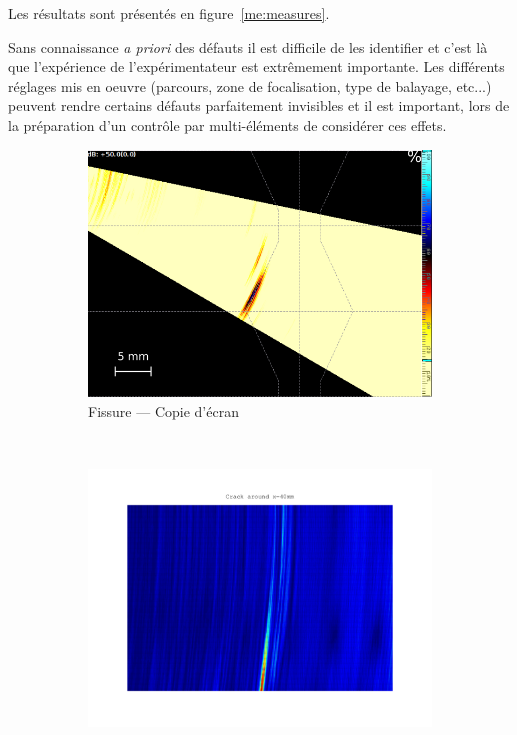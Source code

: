 Les résultats sont présentés en figure~\ref{me:measures}.

Sans connaissance \textit{a priori} des défauts il est difficile de les identifier et c'est là que l'expérience de l'expérimentateur est extrêmement importante.
Les différents réglages mis en oeuvre (parcours, zone de focalisation, type de balayage, etc...) peuvent rendre certains défauts parfaitement invisibles et il est important, lors de la préparation d'un contrôle par multi-éléments de considérer ces effets.

\begin{figure}[!h]
\centering
\begin{subfigure}{0.43\textwidth}
\includegraphics[width=\textwidth]{me_figs/def1.png}
\caption{Fissure --- Copie d'écran}
\end{subfigure}~%
\begin{subfigure}{0.55\textwidth}
\includegraphics[width=\textwidth]{me_figs/crack_measure.png}

\end{subfigure}
\end{figure}
